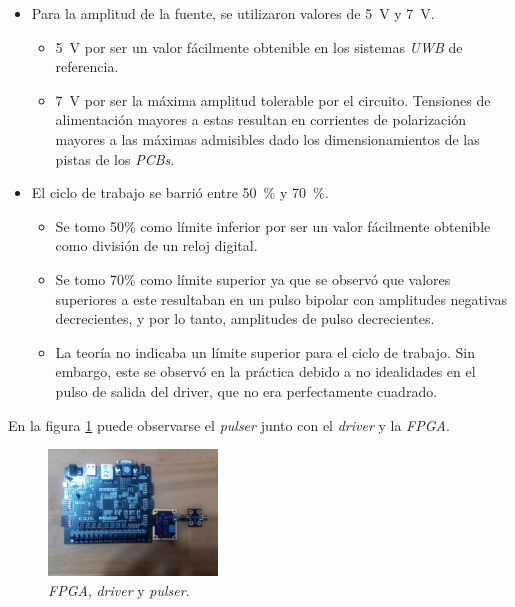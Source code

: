 \begin{itemize}
    \item Para la amplitud de la fuente, se utilizaron valores de \qty{5}{\volt} y
        \qty{7}{\volt}.
        \begin{itemize}
            \item \qty{5}{\volt} por ser un valor fácilmente obtenible en los
                sistemas \textit{UWB} de referencia.
            \item \qty{7}{\volt} por ser la máxima amplitud tolerable por el circuito.
                Tensiones de alimentación mayores a estas resultan en corrientes de
                polarización mayores a las máximas admisibles dado los
                dimensionamientos de las pistas de los \textit{PCBs}.
        \end{itemize}
    \item El ciclo de trabajo se barrió entre \qty{50}{\percent} y
        \qty{70}{\percent}.
        \begin{itemize}
            \item Se tomo 50\% como límite inferior por ser un valor fácilmente
                obtenible como división de un reloj digital.
            \item Se tomo 70\% como límite superior ya que se observó que valores
                superiores a este resultaban en un pulso bipolar con amplitudes
                negativas decrecientes, y por lo tanto, amplitudes de pulso
                decrecientes.
            \item La teoría no indicaba un límite superior para el ciclo de
                trabajo. Sin embargo, este se observó en la práctica debido a no
                idealidades en el pulso de salida del driver, que no era
                perfectamente cuadrado.
        \end{itemize}
\end{itemize}

En la figura \ref{fig:sistema_medido} puede observarse el \textit{pulser} junto con el
\textit{driver} y la \textit{FPGA}.

\begin{figure}
  \centering
    \includegraphics[width=0.4\textwidth]{images/sistema_medido.jpg}
    \caption{\textit{FPGA}, \textit{driver} y \textit{pulser}.}
    \label{fig:sistema_medido}
\end{figure}

